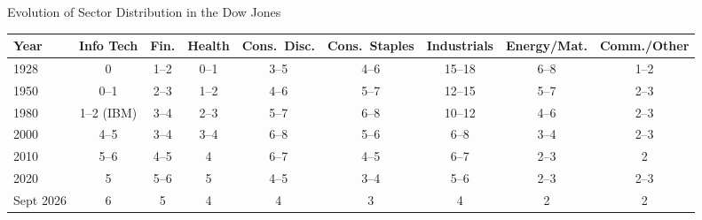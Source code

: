 \documentclass[aspectratio=169]{beamer}
\begin{document}
\begin{frame}{Evolution of Sector Distribution in the Dow Jones}
\begin{table}
\centering
\scriptsize
\setlength{\tabcolsep}{4pt}
\begin{tabular}{lcccccccc}
\toprule
\textbf{Year} & \textbf{Info Tech} & \textbf{Fin.} & \textbf{Health} & \textbf{Cons.\ Disc.} & \textbf{Cons.\ Staples} & \textbf{Industrials} & \textbf{Energy/Mat.} & \textbf{Comm./Other} \\
\midrule
1928 & 0 & 1--2 & 0--1 & 3--5 & 4--6 & 15--18 & 6--8 & 1--2 \\
1950 & 0--1 & 2--3 & 1--2 & 4--6 & 5--7 & 12--15 & 5--7 & 2--3 \\
1980 & 1--2 (IBM) & 3--4 & 2--3 & 5--7 & 6--8 & 10--12 & 4--6 & 2--3 \\
2000 & 4--5 & 3--4 & 3--4 & 6--8 & 5--6 & 6--8 & 3--4 & 2--3 \\
2010 & 5--6 & 4--5 & 4 & 6--7 & 4--5 & 6--7 & 2--3 & 2 \\
2020 & 5 & 5--6 & 5 & 4--5 & 3--4 & 5--6 & 2--3 & 2--3 \\
Sept 2026 & 6 & 5 & 4 & 4 & 3 & 4 & 2 & 2 \\
\bottomrule
\end{tabular}
\end{table}
\end{frame}
\end{document}
